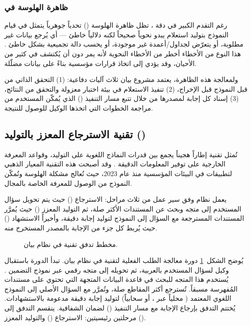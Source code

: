 \subsubsection{ظاهرة الهلوسة في }
\label{subsubsec:nl2sql-hallucination}

رغم التقدم الكبير في دقة ، تظل ظاهرة الهلوسة
() تحدياً جوهرياً يتمثل في قيام النموذج بتوليد استعلام
 يبدو نحوياً صحيحاً لكنه دلالياً خاطئ — أي يُرجع بيانات غير مطلوبة،
أو يتعرّض لجداول/أعمدة غير موجودة، أو يحسب دالة تجميعية بشكل خاطئ \cite{pourreza2023dinsql}.
هذا النوع من الأخطاء أخطر من الأخطاء النحوية لأنه يمر دون أن يُكتشف في كثير
من الأحيان، وقد يؤدي إلى اتخاذ قرارات مؤسسية بناءً على بيانات مضلّلة.

ولمعالجة هذه الظاهرة، يعتمد مشروع بيان ثلاث آليات دفاعية:
(1) التحقق الذاتي من قبل النموذج قبل الإخراج،
(2) تنفيذ الاستعلام في بيئة اختبار معزولة والتحقق من النتائج،
(3) إسناد كل إجابة لمصدرها من خلال تتبع مسار التنفيذ ()
الذي يُمكّن المستخدم من مراجعة الخطوات التي اتخذها الوكيل للوصول للنتيجة.

\subsection{تقنية الاسترجاع المعزز بالتوليد ()}
\label{subsec:rag}

تُمثل تقنية  إطاراً هجيناً يجمع بين قدرات النماذج اللغوية على التوليد،
وقواعد المعرفة الخارجية على توفير المعلومات الدقيقة \cite{lewis2020rag}. وقد
أصبحت هذه التقنية المعيار الذهبي لتطبيقات  في البيئات المؤسسية منذ
عام 2023، حيث تُعالج مشكلة الهلوسة وتُمكّن النموذج من الوصول للمعرفة الخاصة
بالمجال.

يعمل نظام  وفق سير عمل من ثلاث مراحل: الاسترجاع () حيث
يتم تحويل سؤال المستخدم إلى متجه وبحث عن المستندات الأكثر صلة، ثم التوليد
المعزز () حيث يُمرَّر المستندات المسترجعة مع السؤال
إلى النموذج لتوليد إجابة دقيقة، وأخيراً الاستشهاد () حيث يُربط
كل جزء من الإجابة بالمصدر المستخرج منه.

\begin{figure}[!htbp]
  \centering
  \resizebox{0.85\textwidth}{!}{}
  \caption{مخطط تدفق تقنية  في نظام بيان.}
  \label{fig:rag-flow}
\end{figure}

\noindent يُوضح الشكل~\ref{fig:rag-flow} دورة معالجة الطلب الفعلية لتقنية
 في نظام بيان. تبدأ الدورة باستقبال وكيل  لسؤال المستخدم
بالعربية، ثم تحويله إلى متجه رقمي عبر نموذج التضمين
. يُستخدم هذا المتجه للبحث في قاعدة البيانات
المتجهة  التي تحتوي على مستندات  المُفهرسة مسبقاً.
تُسترجع أكثر المقاطع صلة، وتُمرَّر مع السؤال الأصلي إلى النموذج اللغوي المعتمد
( محلياً عبر ، أو  سحابياً) لتوليد
إجابة دقيقة مدعومة بالاستشهادات.
يُختتم التدفق بإرجاع الإجابة مع مسار التنفيذ () لضمان
الشفافية. ينقسم التدفق إلى مرحلتين رئيسيتين: الاسترجاع ()
والتوليد المعزز ().


